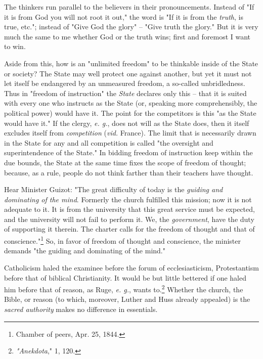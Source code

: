 \documentclass[a4paper]{book}
\begin{document}
The thinkers run parallel to the believers in their pronouncements. Instead of 
"{}If it is from God you will not root it out,"{} the word is "{}If it is from 
the \textit{truth}, is true, etc."{}; instead of "{}Give God the glory"{} -- 
"{}Give truth the glory."{} But it is very much the same to me whether God or 
the truth wins; first and foremost I want to win.

Aside from this, how is an "{}unlimited freedom"{} to be thinkable inside of 
the State or society? The State may well protect one against another, but yet 
it must not let itself be endangered by an unmeasured freedom, a so-called 
unbridledness. Thus in "{}freedom of instruction"{} the \textit{State} 
declares only this -- that it is suited with every one who instructs as the 
State (or, speaking more comprehensibly, the political power) would have it. 
The point for the competitors is this "{}as the State would have it."{} If the 
clergy, \textit{e. g.}, does not will as the State does, then it itself 
excludes itself from \textit{competition} (\textit{vid.} France). The limit 
that is necessarily drawn in the State for any and all competition is called 
"{}the oversight and superintendence of the State."{} In bidding freedom of 
instruction keep within the due bounds, the State at the same time fixes the 
scope of freedom of thought; because, as a rule, people do not think farther 
than their teachers have thought.

Hear Minister Guizot: "{}The great difficulty of today is the \textit{guiding 
and dominating of the mind}. Formerly the church fulfilled this mission; now 
it is not adequate to it. It is from the university that this great service 
must be expected, and the university will not fail to perform it. We, the 
\textit{government}, have the duty of supporting it therein. The charter calls 
for the freedom of thought and that of conscience."{}\footnote{Chamber of 
peers, Apr. 25, 1844.} So, in favor of freedom of thought and conscience, the 
minister demands "{}the guiding and dominating of the mind."{}

Catholicism haled the examinee before the forum of ecclesiasticism, 
Protestantism before that of biblical Christianity. It would be but little 
bettered if one haled him before that of reason, as Ruge, \textit{e. g.}, 
wants to.\footnote{\textit{"{}Anekdota},"{} 1, 120.} Whether the church, the 
Bible, or reason (to which, moreover, Luther and Huss already appealed) is the 
\textit{sacred authority} makes no difference in essentials.
\end{document}
